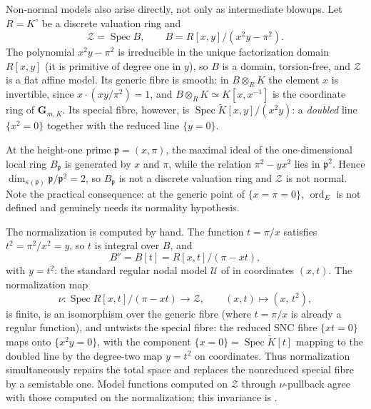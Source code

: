 \begin{example}
\label{ex:non-normal-model-normalization}
Non-normal models also arise directly, not only as intermediate blowups.
Let $R=K^\circ$ be a discrete valuation ring and
\[
        \mathcal Z=\operatorname{Spec}B,\qquad B=R[x,y]/(x^2y-\pi^2).
\]
The polynomial $x^2y-\pi^2$ is irreducible in the unique factorization
domain $R[x,y]$ (it is primitive of degree one in $y$), so $B$ is a domain,
torsion-free, and $\mathcal Z$ is a flat affine model.  Its generic fibre
is smooth: in $B\otimes_RK$ the element $x$ is invertible, since
$x\cdot(xy/\pi^2)=1$, and
$B\otimes_RK\simeq K[x,x^{-1}]$ is the coordinate ring of
$\mathbf G_{m,K}$.  Its special fibre, however, is
$\operatorname{Spec}\widetilde K[x,y]/(x^2y)$: a \emph{doubled} line
$\{x^2=0\}$ together with the reduced line $\{y=0\}$.

At the height-one prime $\mathfrak p=(x,\pi)$, the maximal ideal of the
one-dimensional local ring $B_{\mathfrak p}$ is generated by $x$ and
$\pi$, while the relation $\pi^2-yx^2$ lies in
$\mathfrak p^2$.  Hence
$\dim_{\kappa(\mathfrak p)}\mathfrak p/\mathfrak p^2=2$, so
$B_{\mathfrak p}$ is not a discrete valuation ring and $\mathcal Z$ is not
normal.  Note the practical consequence: at the generic point of
$\{x=\pi=0\}$, $\operatorname{ord}_E$ is not defined and
 genuinely needs its normality hypothesis.

The normalization is computed by hand.  The function $t=\pi/x$ satisfies
$t^2=\pi^2/x^2=y$, so $t$ is integral over $B$, and
\[
   B^\nu=B[t]=R[x,t]/(\pi-xt),
\]
with $y=t^2$: the standard regular nodal model $\mathcal U$ of
 in coordinates $(x,t)$.  The normalization map
\[
   \nu:\operatorname{Spec}R[x,t]/(\pi-xt)
   \longrightarrow\mathcal Z,
   \qquad (x,t)\longmapsto(x,\,t^2),
\]
is finite, is an isomorphism over the generic fibre (where $t=\pi/x$ is
already a regular function), and untwists the special fibre: the reduced
SNC fibre $\{xt=0\}$ maps onto $\{x^2y=0\}$, with the component
$\{x=0\}=\operatorname{Spec}\widetilde K[t]$ mapping to the doubled line by
the degree-two map $y=t^2$ on coordinates.  Thus normalization simultaneously
repairs the total space and replaces the nonreduced special fibre by a
semistable one.  Model functions computed on $\mathcal Z$ through
$\nu$-pullback agree with those computed on the normalization; this
invariance is .
\end{example}

